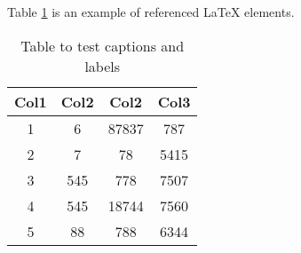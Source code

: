 \documentclass{article}
\begin{document}
    Table \ref{table:data} is an example of referenced \LaTeX{} elements.

    \begin{table}[h!]
        \centering
        \begin{tabular}{||c c c c||} 
            \hline
            Col1 & Col2 & Col2 & Col3 \\ [0.5ex] 
            \hline\hline
             1 & 6 & 87837 & 787 \\ 
             2 & 7 & 78 & 5415 \\
             3 & 545 & 778 & 7507 \\
             4 & 545 & 18744 & 7560 \\
             5 & 88 & 788 & 6344 \\ [1ex] 
             \hline
        \end{tabular}
        \caption{Table to test captions and labels}
        \label{table:data}
    \end{table}
\end{document}
